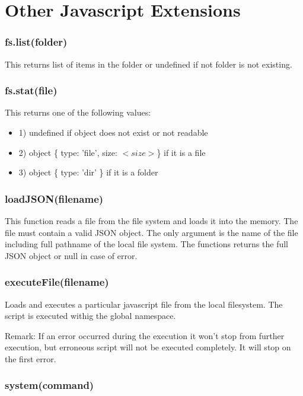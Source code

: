 \section{Other Javascript Extensions}

\subsubsection{fs.list(folder)}

This returns list of items in the folder or undefined if not folder is not existing.


\subsubsection{fs.stat(file)}

This returns one of the following values:

\begin{itemize}
\item 1) undefined if object does not exist or not readable
\item 2) object \{ type: 'file', size: $<size>$\} if it is a file
\item 3) object \{ type: 'dir' \} if it is a folder
\end{itemize} 


\subsubsection{loadJSON(filename)}

This function reads a file from the file system and loads it into the memory. The file must contain a valid JSON object. The only argument is the name of the file including full pathname of the local file system. The functions returns the full JSON object or null in case of error.

\subsubsection{executeFile(filename)}

Loads and executes a particular javascript file from the local filesystem.
The script is executed withig the global namespace.

Remark: If an error occurred during the execution it won't stop from further execution, but erroneous script will not be executed completely. It will stop on the first error.

\subsubsection{system(command)}

